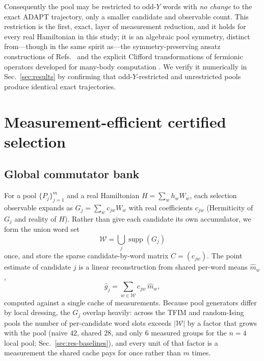 \documentclass[aps,pra,reprint,superscriptaddress,nofootinbib,floatfix]{revtex4-2}
\newcommand{\calW}{\mathcal{W}}
\newcommand{\supp}{\operatorname{supp}}
\begin{document}
Consequently the pool may be restricted to odd-$Y$ words with \emph{no change} to the exact ADAPT trajectory, only a smaller candidate and observable count. This restriction is the first, exact, layer of measurement reduction, and it holds for every real Hamiltonian in this study; it is an algebraic pool symmetry, distinct from---though in the same spirit as---the symmetry-preserving ansatz constructions of Refs.~\cite{yoo2025symmetry} and the explicit Clifford transformations of fermionic operators developed for many-body computation \cite{evangelista2025exact,magoulas2026clifford}. We verify it numerically in Sec.~\ref{sec:results} by confirming that odd-$Y$-restricted and unrestricted pools produce identical exact trajectories.

\section{Measurement-efficient certified selection}
\label{sec:method}

\subsection{Global commutator bank}
\label{sec:bank}

For a pool $\{P_j\}_{j=1}^{m}$ and a real Hamiltonian $H=\sum_w h_w W_w$, each selection observable expands as $G_j=\sum_{w} c_{jw}W_w$ with real coefficients $c_{jw}$ (Hermiticity of $G_j$ and reality of $H$). Rather than give each candidate its own accumulator, we form the union word set
\begin{equation}
\calW=\bigcup_{j}\supp(G_j)
\label{eq:wordset}
\end{equation}
once, and store the sparse candidate-by-word matrix $C=(c_{jw})$. The point estimate of candidate $j$ is a linear reconstruction from shared per-word means $\widehat m_w$,
\begin{equation}
\widehat g_j=\sum_{w\in\calW}c_{jw}\,\widehat m_w,
\label{eq:bankest}
\end{equation}
computed against a single cache of measurements. Because pool generators differ by local dressing, the $G_j$ overlap heavily: across the TFIM and random-Ising pools the number of per-candidate word slots exceeds $|\calW|$ by a factor that grows with the pool (naive $42$, shared $28$, and only $6$ measured groups for the $n=4$ local pool; Sec.~\ref{sec:res-baselines}), and every unit of that factor is a measurement the shared cache pays for once rather than $m$ times.
\end{document}
